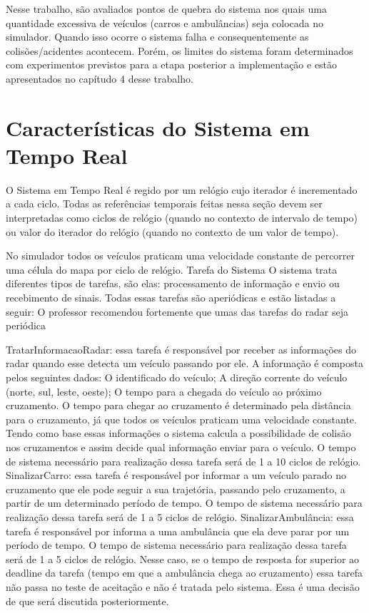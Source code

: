 Nesse trabalho, são avaliados pontos de quebra do sistema nos quais uma quantidade excessiva de veículos (carros e ambulâncias) seja colocada no simulador. Quando isso ocorre o sistema falha e consequentemente as colisões/acidentes acontecem. Porém, os limites do sistema foram determinados com experimentos previstos para a etapa posterior a implementação e estão apresentados no capítudo 4 desse trabalho.

\section{Características do Sistema em Tempo Real}

O Sistema em Tempo Real é regido por um relógio cujo iterador é incrementado a cada ciclo. Todas as referências temporais feitas nessa seção devem ser interpretadas como ciclos de relógio (quando no contexto de intervalo de tempo) ou valor do iterador do relógio (quando no contexto de um valor de tempo).

No simulador todos os veículos praticam uma velocidade constante de percorrer uma célula do mapa por ciclo de relógio.
Tarefa do Sistema
O sistema trata diferentes tipos de tarefas, são elas: processamento de informação e envio ou recebimento de sinais. Todas essas tarefas são aperiódicas e estão listadas a seguir:
{O professor recomendou fortemente que umas das tarefas do radar seja periódica}

TratarInformacaoRadar: essa tarefa é responsável por receber as informações do radar quando esse detecta um veículo passando por ele. A informação é composta pelos seguintes dados:
O identificado do veículo;
A direção corrente do veículo (norte, sul, leste, oeste);
O tempo para a chegada do veículo ao próximo cruzamento. O tempo para chegar ao cruzamento é determinado pela distância para o cruzamento, já que todos os veículos praticam uma velocidade constante. Tendo como base essas informações o sistema calcula a possibilidade de colisão nos cruzamentos e assim decide qual informação enviar para o veículo. O tempo de sistema necessário para realização dessa tarefa será de 1 a 10 ciclos de relógio.
SinalizarCarro: essa tarefa é responsável por informar a um veículo parado no cruzamento que ele pode seguir a sua trajetória, passando pelo cruzamento, a partir de um determinado período de tempo. O tempo de sistema necessário para realização dessa tarefa será de 1 a 5 ciclos de relógio.
SinalizarAmbulância: essa tarefa é responsável por informa a uma ambulância que ela deve parar por um período de tempo. O tempo de sistema necessário para realização dessa tarefa será de 1 a 5 ciclos de relógio. Nesse caso, se o tempo de resposta for superior ao deadline da tarefa (tempo em que a ambulância chega ao cruzamento) essa tarefa não passa no teste de aceitação e não é tratada pelo sistema.
 Essa é uma decisão de que será discutida posteriormente.

